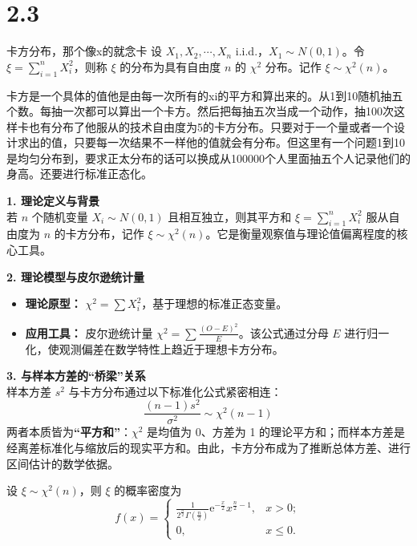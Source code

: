 \section*{2.3}
\begin{definition}{卡方分布，那个像x的就念卡}
设 $X_1, X_2, \cdots, X_n$ i.i.d.，$X_1 \sim N(0,1)$。令 $\xi = \sum_{i=1}^{n} X_i^2$，则称 $\xi$ 的分布为具有自由度 $n$ 的 $\chi^2$ 分布。记作 $\xi \sim \chi^2(n)$。
\end{definition}
\begin{dxtips}
    卡方是一个具体的值他是由每一次所有的xi的平方和算出来的。从1到10随机抽五个数。每抽一次都可以算出一个卡方。然后把每抽五次当成一个动作，抽100次这样卡也有分布了他服从的技术自由度为5的卡方分布。只要对于一个量或者一个设计求出的值，只要每一次结果不一样他的值就会有分布。但这里有一个问题1到10是均匀分布到，要求正太分布的话可以换成从100000个人里面抽五个人记录他们的身高。还要进行标准正态化。
\end{dxtips}
\begin{note}
\textbf{1. 理论定义与背景} \\
若 $n$ 个随机变量 $X_i \sim N(0,1)$ 且相互独立，则其平方和 $\xi = \sum_{i=1}^{n} X_{i}^{2}$ 服从自由度为 $n$ 的卡方分布，记作 $\xi \sim \chi^{2}(n)$。它是衡量观察值与理论值偏离程度的核心工具。

\textbf{2. 理论模型与皮尔逊统计量} \\
\begin{itemize}
    \item \textbf{理论原型：} $\chi^{2} = \sum X_{i}^{2}$，基于理想的标准正态变量。
    \item \textbf{应用工具：} 皮尔逊统计量 $\chi^{2} = \sum \frac{(O-E)^{2}}{E}$。该公式通过分母 $E$ 进行归一化，使观测偏差在数学特性上趋近于理想卡方分布。
\end{itemize}

\textbf{3. 与样本方差的“桥梁”关系} \\
样本方差 $s^{2}$ 与卡方分布通过以下标准化公式紧密相连：
$$\frac{(n-1)s^{2}}{\sigma^{2}} \sim \chi^{2}(n-1)$$
两者本质皆为\textbf{“平方和”}：$\chi^{2}$ 是均值为 0、方差为 1 的理论平方和；而样本方差是经离差标准化与缩放后的现实平方和。由此，卡方分布成为了推断总体方差、进行区间估计的数学依据。
\end{note}
\begin{theorem}
    设 $\xi \sim \chi^2(n)$，则 $\xi$ 的概率密度为
    \begin{equation}
        f(x) = \begin{cases}
            \frac{1}{2^{\frac{n}{2}}\Gamma\left(\frac{n}{2}\right)} \mathrm{e}^{-\frac{x}{2}} x^{\frac{n}{2}-1}, & x > 0; \\
            0, & x \le 0.
        \end{cases}
    \end{equation}
\end{theorem}

